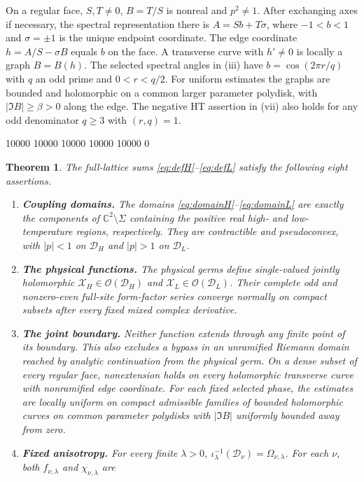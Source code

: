 \documentclass[11pt]{article}
\numberwithin{equation}{section}
\newtheorem{theorem}{Theorem}[section]
\theoremstyle{definition}
\newcommand{\C}{\mathbb C}
\begin{document}
On a regular face, $S,T\ne0$, $B=T/S$ is nonreal and $p^2\ne1$.
After exchanging axes if necessary, the spectral representation there
is $A=Sb+T\sigma$, where $-1<b<1$ and $\sigma=\pm1$ is the unique
endpoint coordinate. The edge coordinate $h=A/S-\sigma B$ equals $b$
on the face. A transverse curve with $h'\ne0$ is locally a graph $B=B(h)$.
The selected spectral angles in (iii) have $b=\cos(2\pi r/q)$ with
$q$ an odd prime and $0<r<q/2$. For uniform estimates the graphs are
bounded and holomorphic on a common larger parameter polydisk, with
$|\Im B|\ge\beta>0$ along the edge. The negative HT assertion in (vii)
also holds for any odd denominator $q\ge3$ with $(r,q)=1$.

\begingroup{} 10000 10000 10000 10000 10000 0\relax
\begin{theorem}\label{thm:unified}
The full-lattice sums \eqref{eq:defH}--\eqref{eq:defL} satisfy the following eight assertions.
\begin{enumerate}[label=\textup{(\roman*)},leftmargin=*]
\item \textup{\textbf{Coupling domains.}} The domains \eqref{eq:domainH}--\eqref{eq:domainL} are exactly the
components of $\C^2\setminus\Sigma$ containing the positive real
high- and low-temperature regions, respectively. They are contractible
and pseudoconvex, with $|p|<1$ on $\mathcal D_H$ and $|p|>1$ on
$\mathcal D_L$.
\item \textup{\textbf{The physical functions.}} The physical germs define single-valued jointly holomorphic
$\mathcal X_H\in\mathcal O(\mathcal D_H)$ and
$\mathcal X_L\in\mathcal O(\mathcal D_L)$. Their complete odd and
nonzero-even full-site form-factor series converge normally on compact
subsets after every fixed mixed complex derivative.
\item \textup{\textbf{The joint boundary.}} Neither function extends through any finite point of its boundary.
This also excludes a bypass in an unramified Riemann domain reached
by analytic continuation from the physical germ. On a dense subset of
every regular face, nonextension holds on every holomorphic transverse
curve with nonramified edge coordinate. For each fixed selected phase,
the estimates are locally uniform on compact admissible families of
bounded holomorphic curves on common parameter polydisks with $|\Im B|$
uniformly bounded away from zero.
\item \textup{\textbf{Fixed anisotropy.}} For every finite $\lambda>0$,
$\iota_\lambda^{-1}(\mathcal D_\nu)=\Omega_{\nu,\lambda}$.
For each $\nu$, both $f_{\nu,\lambda}$ and $\chi_{\nu,\lambda}$ are

\end{enumerate}
\end{theorem}
\end{document}
